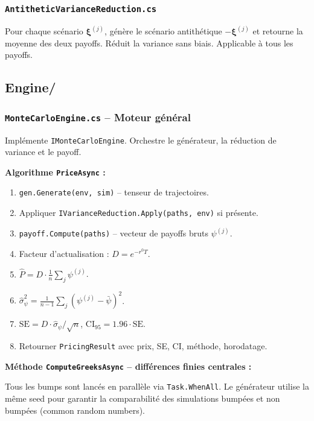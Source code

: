 \documentclass[a4paper,11pt]{article}
\newcommand{\cs}[1]{\texttt{\color{codeinline}#1}}
\begin{document}
\subsubsection{\texttt{AntitheticVarianceReduction.cs}}

Pour chaque sc\'enario $\boldsymbol{\xi}^{(j)}$, g\'en\`ere le sc\'enario antith\'etique
$-\boldsymbol{\xi}^{(j)}$ et retourne la moyenne des deux payoffs. R\'eduit la variance
sans biais. Applicable \`a tous les payoffs.

\subsection{Engine/}

\subsubsection{\texttt{MonteCarloEngine.cs} -- Moteur g\'en\'eral}

Impl\'emente \cs{IMonteCarloEngine}. Orchestre le g\'en\'erateur, la r\'eduction de
variance et le payoff.

\textbf{Algorithme \cs{PriceAsync} :}
\begin{enumerate}[leftmargin=1.5em]
  \item \cs{gen.Generate(env, sim)} -- tenseur de trajectoires.
  \item Appliquer \cs{IVarianceReduction.Apply(paths, env)} si pr\'esente.
  \item \cs{payoff.Compute(paths)} -- vecteur de payoffs bruts $\psi^{(j)}$.
  \item Facteur d'actualisation : $D = e^{-r^0 T}$.
  \item $\hat{P} = D \cdot \frac{1}{n}\sum_j \psi^{(j)}$.
  \item $\hat{\sigma}_\psi^2 = \frac{1}{n-1}\sum_j (\psi^{(j)} - \bar{\psi})^2$.
  \item $\text{SE} = D \cdot \hat{\sigma}_\psi / \sqrt{n}$, $\text{CI}_{95} = 1.96 \cdot \text{SE}$.
  \item Retourner \cs{PricingResult} avec prix, SE, CI, m\'ethode, horodatage.
\end{enumerate}

\textbf{M\'ethode \cs{ComputeGreeksAsync} -- diff\'erences finies centrales :}

Tous les bumps sont lanc\'es en parall\`ele via \cs{Task.WhenAll}. Le g\'en\'erateur
utilise la m\^eme seed pour garantir la comparabilit\'e des simulations bump\'ees
et non bump\'ees (common random numbers).
\end{document}
